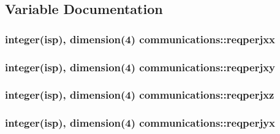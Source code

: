 \subsection{Variable Documentation}
\subsubsection[{\texorpdfstring{reqperjxx}{reqperjxx}}]{\setlength{\rightskip}{0pt plus 5cm}integer(isp), dimension(4) communications\+::reqperjxx}\hypertarget{namespacecommunications_ab09f2571f6d9283fbc47609b3e6de32a}{}\label{namespacecommunications_ab09f2571f6d9283fbc47609b3e6de32a}
\subsubsection[{\texorpdfstring{reqperjxy}{reqperjxy}}]{\setlength{\rightskip}{0pt plus 5cm}integer(isp), dimension(4) communications\+::reqperjxy}\hypertarget{namespacecommunications_a579ce4f6ca8641ffb00fd802371714c3}{}\label{namespacecommunications_a579ce4f6ca8641ffb00fd802371714c3}
\subsubsection[{\texorpdfstring{reqperjxz}{reqperjxz}}]{\setlength{\rightskip}{0pt plus 5cm}integer(isp), dimension(4) communications\+::reqperjxz}\hypertarget{namespacecommunications_afa5731d4931bff540f2d1e62849afb6c}{}\label{namespacecommunications_afa5731d4931bff540f2d1e62849afb6c}
\subsubsection[{\texorpdfstring{reqperjyx}{reqperjyx}}]{\setlength{\rightskip}{0pt plus 5cm}integer(isp), dimension(4) communications\+::reqperjyx}\hypertarget{namespacecommunications_a44e505738aca0afddea17f1b8800be28}{}\label{namespacecommunications_a44e505738aca0afddea17f1b8800be28}
